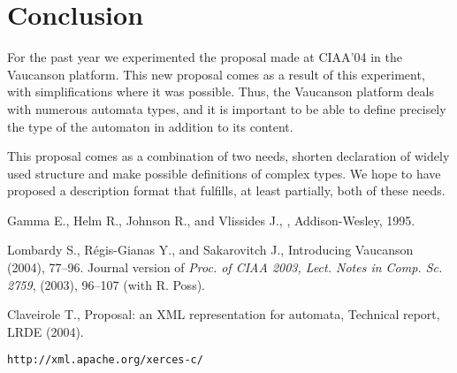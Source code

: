 \documentclass[a4paper]{article}
\newcommand{\Vauc}{{\sc Vaucanson}\xspace}
\begin{document}




\section{Conclusion}

For the past year we experimented the proposal made at CIAA'04 in the
\Vauc platform. This new proposal comes as a result of this
experiment, with simplifications where it was possible. Thus, the
\Vauc platform deals with numerous automata types, and it is important
to be able to define precisely the type of the automaton in addition
to its content.

This proposal comes as a combination of two needs, shorten declaration
of widely used structure and make possible definitions of complex
types. We hope to have proposed a description format that fulfills, at
least partially, both of these needs.




{\small%
\begin{thebibliography}{1}

{\sc Gamma E., Helm R., Johnson R., and Vlissides J.},
,
\newblock Addison-Wesley, 1995.

{\sc Lombardy S., R\'egis-Gianas Y., and Sakarovitch J.},
\newblock Introducing Vaucanson
 (2004), 77--96.
\newblock Journal version of 
{\em Proc. of CIAA 2003, Lect. Notes in Comp. Sc. 2759}, (2003), 
96--107 
\newblock (with {\sc R. Poss}).

{\sc Claveirole T.},
\newblock Proposal: an XML representation for automata,
\newblock Technical report, LRDE (2004).


\verb+http://xml.apache.org/xerces-c/+
\end{thebibliography}}
\end{document}
